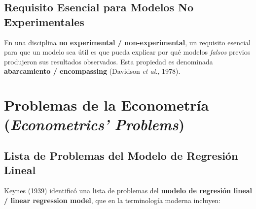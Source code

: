 \documentclass[12pt]{article}
\begin{document}
\subsection{Requisito Esencial para Modelos No Experimentales}

En una disciplina \textbf{no experimental / non-experimental}, un requisito esencial para que un modelo sea \'util es que pueda explicar por qu\'e modelos \textit{falsos} previos produjeron sus resultados observados. Esta propiedad es denominada \textbf{abarcamiento / encompassing} (Davidson \textit{et al.}, 1978).

\section{Problemas de la Econometr\'ia (\textit{Econometrics' Problems})}

\subsection{Lista de Problemas del Modelo de Regresi\'on Lineal}

Keynes (1939) identific\'o una lista de problemas del \textbf{modelo de regresi\'on lineal / linear regression model}, que en la terminolog\'ia moderna incluyen:
\end{document}
